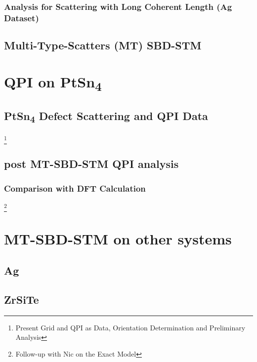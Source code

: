 \subsection{Analysis for Scattering with Long Coherent Length (Ag Dataset)}
\section{Multi-Type-Scatters (MT) SBD-STM}

\chapter{QPI on PtSn\textsubscript{4}}
\section{PtSn\textsubscript{4} Defect Scattering and QPI Data}
\footnote{Present Grid and QPI as Data, Orientation Determination and Preliminary Analysis}
\section{post MT-SBD-STM QPI analysis}
\subsection{Comparison with DFT Calculation}
\footnote{Follow-up with Nic on the Exact Model}

\chapter{MT-SBD-STM on other systems}
\section{Ag}
\section{ZrSiTe}